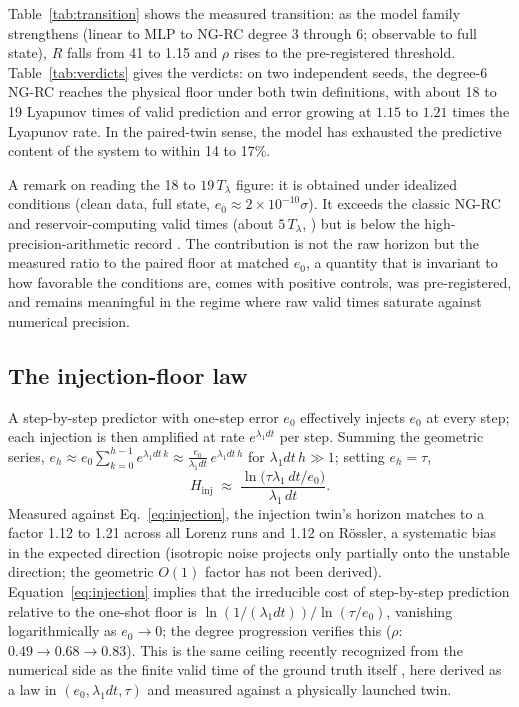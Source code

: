 \documentclass[aps,pre,twocolumn,superscriptaddress,nofootinbib,longbibliography]{revtex4-2}
\newcommand{\Tlyap}{T_\lambda}
\begin{document}
Table~\ref{tab:transition} shows the measured transition: as the model
family strengthens (linear to MLP to NG-RC degree 3 through 6; observable
to full state), $R$ falls from 41 to 1.15 and $\rho$ rises to the
pre-registered threshold. Table~\ref{tab:verdicts} gives the verdicts: on
two independent seeds, the degree-6 NG-RC reaches the physical floor
under both twin definitions, with about 18 to 19 Lyapunov times of valid
prediction and error growing at $1.15$ to $1.21$ times the Lyapunov rate.
In the paired-twin sense, the model has exhausted the predictive content
of the system to within 14 to 17\%.

A remark on reading the 18 to $19\,\Tlyap$ figure: it is obtained under
idealized conditions (clean data, full state, $e_0 \approx 2\times
10^{-10}\sigma$). It exceeds the classic NG-RC and reservoir-computing
valid times (about $5\,\Tlyap$, \citealp{gauthier2021ngrc,
pathak2018modelfree}) but is below the high-precision-arithmetic record
\citep{schotz2025machineprecision}. The contribution is not the raw
horizon but the measured ratio to the paired floor at matched $e_0$, a
quantity that is invariant to how favorable the conditions are, comes
with positive controls, was pre-registered, and remains meaningful in
the regime where raw valid times saturate against numerical precision.

\subsection{The injection-floor law}
\label{sec:injection}

A step-by-step predictor with one-step error $e_0$ effectively injects
$e_0$ at every step; each injection is then amplified at rate
$e^{\lambda_1 dt}$ per step. Summing the geometric series,
$e_h \approx e_0 \sum_{k=0}^{h-1} e^{\lambda_1 dt\,k} \approx
\frac{e_0}{\lambda_1 dt}\, e^{\lambda_1 dt\,h}$ for
$\lambda_1 dt\, h \gg 1$; setting $e_h = \tau$,
\begin{equation}
H_{\mathrm{inj}} \;\approx\; \frac{\ln\!\big(\tau \lambda_1\,dt / e_0\big)}
{\lambda_1\,dt}.
\label{eq:injection}
\end{equation}
Measured against Eq.~\eqref{eq:injection}, the injection twin's horizon
matches to a factor 1.12 to 1.21 across all Lorenz runs and 1.12 on
R\"ossler, a systematic bias in the expected direction (isotropic noise
projects only partially onto the unstable direction; the geometric $O(1)$
factor has not been derived). Equation~\eqref{eq:injection} implies that
the irreducible cost of step-by-step prediction relative to the one-shot
floor is $\ln(1/(\lambda_1 dt))/\ln(\tau/e_0)$, vanishing
logarithmically as $e_0 \to 0$; the degree progression verifies this
($\rho$: $0.49 \to 0.68 \to 0.83$). This is the same ceiling recently
recognized from the numerical side as the finite valid time of the ground
truth itself \citep{schotz2025machineprecision,hurley2025reservoir}, here
derived as a law in $(e_0, \lambda_1 dt, \tau)$ and measured against a
physically launched twin.
\end{document}
